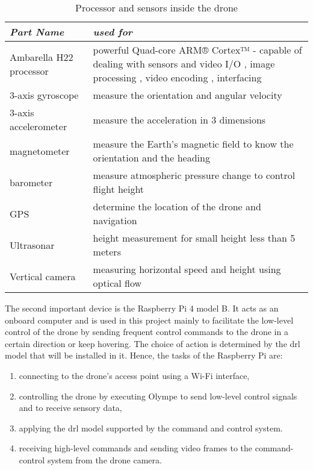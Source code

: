 \documentclass[../main.tex]{subfiles}
\begin{document}
\begin{table}[H]
	\centering
	\caption{Processor and sensors inside the drone}
	\label{tab:sensors-table}  
	\begin{tabular}{ p{4cm} p{8cm} }
		\toprule
		\textit{Part Name} 
		& \textit{used for}  \\ 
		
		\midrule
		Ambarella H22 
		processor
		& powerful Quad-core ARM® Cortex™ - capable of dealing with sensors and video I/O , 
		image processing , video encoding , interfacing \\ 
		3-axis gyroscope
		& measure the orientation and angular velocity  \\ 
		3-axis accelerometer
		& measure the acceleration in 3 dimensions  \\ 
		magnetometer 
		& measure the Earth's magnetic field to know the orientation and the heading   \\ 
				barometer 
		& measure atmospheric pressure change to control flight height   \\ 
				GPS 
		& determine the location of the drone and navigation  \\ 
				Ultrasonar 
		&  height measurement for small height less than 5 meters  \\ 
				Vertical camera 
		&  measuring horizontal speed and height using optical flow \\ 
        \bottomrule
    \end{tabular}
\end{table}   

The second important device is the Raspberry Pi 4 model B. It 
acts as an onboard computer and is used in this project
mainly to facilitate the low-level control of the drone
by sending frequent control commands to the drone
in a certain direction or keep hovering.
The choice of action is determined by the \gls{drl}
model that will be installed in it.
Hence, the tasks of the Raspberry Pi are: 

\begin{enumerate}
	\item connecting to the drone's access point 
	using a Wi-Fi interface,
	\item controlling the drone 
	by executing Olympe to send low-level control signals 
	and to receive sensory data,
	\item applying the \gls{drl} model supported by 
	the command and control system.
	\item receiving high-level commands and sending video 
	frames to the command-control system from the drone camera.
\end{enumerate}
 
\end{document}
